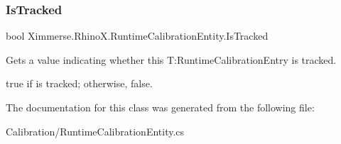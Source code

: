 \subsubsection{\texorpdfstring{Is\+Tracked}{IsTracked}}
{\footnotesize\ttfamily bool Ximmerse.\+Rhino\+X.\+Runtime\+Calibration\+Entity.\+Is\+Tracked\hspace{0.3cm}{\ttfamily [get]}}



Gets a value indicating whether this T\+:\+Runtime\+Calibration\+Entry is tracked. 

{\ttfamily true} if is tracked; otherwise, {\ttfamily false}.

The documentation for this class was generated from the following file\+:\begin{DoxyCompactItemize}
\item 
Calibration/Runtime\+Calibration\+Entity.\+cs\end{DoxyCompactItemize}
